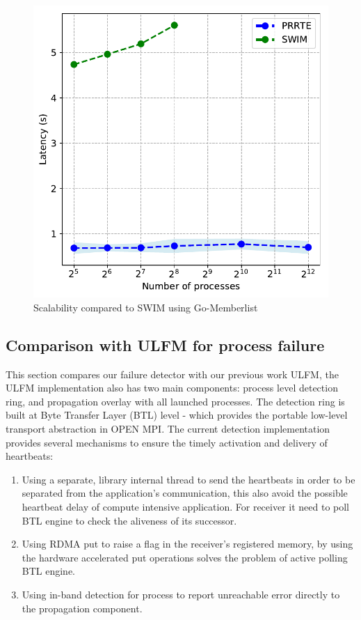 \documentclass[sigconf]{acmart}
\begin{document}
\begin{figure}[h]
  \centering
  \includegraphics[width=\linewidth]{Scale_prrte_swim.pdf}
  \caption{Scalability compared to SWIM using Go-Memberlist}
\end{figure}

\subsection{Comparison with ULFM for process failure}
This section compares our failure detector with our previous work ULFM\cite{George16}, the ULFM implementation also has two main components: process level detection ring, and propagation overlay with all launched processes. The detection ring is built at Byte Transfer Layer (BTL) level - which provides the portable low-level transport abstraction in OPEN MPI. The current detection implementation provides several mechanisms to ensure the timely activation and delivery of heartbeats:
\begin{enumerate}
  \item Using a separate, library internal thread to send the heartbeats in order to be separated from the application's communication, this also avoid the possible heartbeat delay of compute intensive application. For receiver it need to poll BTL engine to check the aliveness of its successor. 
  \item Using RDMA put to raise a flag in the receiver's registered memory, by using the hardware accelerated put operations solves the problem of active polling BTL engine. 
  \item Using in-band detection for process to report unreachable error directly to the propagation component.
\end{enumerate}
\end{document}
